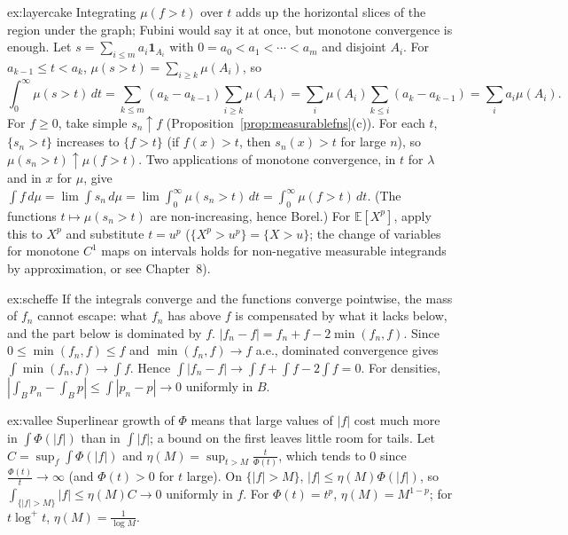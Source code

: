 \begin{solution}{ex:layercake}
\idea Integrating $\mu(f>t)$ over $t$ adds up the horizontal slices of the region under the graph; Fubini would say it at once, but monotone convergence is enough.
\writeup Let $s=\sum_{i\le m}a_i\mathbf 1_{A_i}$ with $0=a_0<a_1<\cdots<a_m$ and disjoint $A_i$. For $a_{k-1}\le t<a_k$, $\mu(s>t)=\sum_{i\ge k}\mu(A_i)$, so
\[\int_0^\infty\mu(s>t)\,dt=\sum_{k\le m}(a_k-a_{k-1})\sum_{i\ge k}\mu(A_i)=\sum_i\mu(A_i)\sum_{k\le i}(a_k-a_{k-1})=\sum_ia_i\mu(A_i).\]
For $f\ge0$, take simple $s_n\uparrow f$ (Proposition~\ref{prop:measurablefns}(c)). For each $t$, $\{s_n>t\}$ increases to $\{f>t\}$ (if $f(x)>t$, then $s_n(x)>t$ for large $n$), so $\mu(s_n>t)\uparrow\mu(f>t)$. Two
applications of monotone convergence, in $t$ for $\lambda$ and in $x$ for $\mu$, give $\int f\,d\mu=\lim\int s_n\,d\mu=\lim\int_0^\infty\mu(s_n>t)\,dt=\int_0^\infty\mu(f>t)\,dt$. (The functions $t\mapsto\mu(s_n>t)$ are
non-increasing, hence Borel.) For $\mathbb E[X^p]$, apply this to $X^p$ and substitute $t=u^p$ ($\{X^p>u^p\}=\{X>u\}$; the change of variables for monotone $C^1$ maps on intervals holds for
non-negative measurable integrands by approximation, or see Chapter~8).
\end{solution}

\begin{solution}{ex:scheffe}
\idea If the integrals converge and the functions converge pointwise, the mass of $f_n$ cannot escape: what $f_n$ has above $f$ is compensated by what it lacks below, and
the part below is dominated by $f$.
\writeup $|f_n-f|=f_n+f-2\min(f_n,f)$. Since $0\le\min(f_n,f)\le f$ and $\min(f_n,f)\to f$ a.e., dominated convergence gives $\int\min(f_n,f)\to\int f$. Hence $\int|f_n-f|\to\int f+\int f-2\int f=0$. For
densities, $|\int_Bp_n-\int_Bp|\le\int|p_n-p|\to0$ uniformly in $B$.
\end{solution}

\begin{solution}{ex:vallee}
\idea Superlinear growth of $\Phi$ means that large values of $|f|$ cost much more in $\int\Phi(|f|)$ than in $\int|f|$; a bound on the first leaves little room for tails.
\writeup Let $C=\sup_f\int\Phi(|f|)$ and $\eta(M)=\sup_{t>M}\frac t{\Phi(t)}$, which tends to $0$ since $\frac{\Phi(t)}t\to\infty$ (and $\Phi(t)>0$ for $t$ large). On $\{|f|>M\}$, $|f|\le\eta(M)\Phi(|f|)$, so
$\int_{\{|f|>M\}}|f|\le\eta(M)C\to0$ uniformly in $f$. For $\Phi(t)=t^p$, $\eta(M)=M^{1-p}$; for $t\log^+t$, $\eta(M)=\frac1{\log M}$.
\end{solution}

